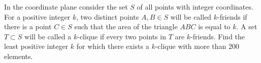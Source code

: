 In the coordinate plane consider the set $S$ of all points with integer coordinates. For a positive integer $k$, two distinct points $A, B \in S$ will be called $k$-friends if there is a point $C \in S$ such that the area of the triangle $ABC$ is equal to $k$. A set $T \subset S$ will be called a $k$-clique if every two points in $T$ are $k$-friends. Find the least positive integer $k$ for which there exists a $k$-clique with more than $200$ elements.
